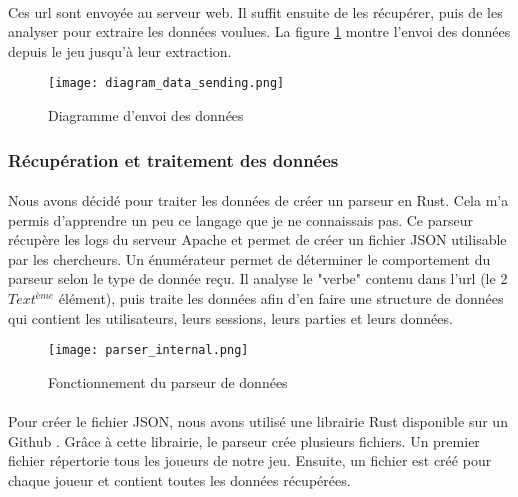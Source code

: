 \paragraph{}Ces url sont envoyée au serveur web. Il suffit ensuite de les récupérer, puis de les analyser pour extraire les données voulues. La figure \ref{DataSending} montre l'envoi
des données depuis le jeu jusqu'à leur extraction.

\begin{figure}[H]
    \begin{center}
    \texttt{[image: diagram\_data\_sending.png]}
    \end{center}
    \caption{Diagramme d'envoi des données}
\label{DataSending}
\end{figure}


\subsubsection{Récupération et traitement des données}

\paragraph{}Nous avons décidé pour traiter les données de créer un parseur en Rust. Cela m'a permis d'apprendre un peu ce langage que je ne connaissais pas. Ce parseur récupère les logs
du serveur Apache et permet de créer un fichier JSON utilisable par les chercheurs. Un énumérateur permet de déterminer le comportement du parseur selon le type de donnée reçu. Il analyse
le "verbe" contenu dans l'url (le 2$Text^{ème}$ élément), puis traite les données afin d'en faire une structure de données qui contient les utilisateurs, leurs sessions, leurs parties et
leurs données.

\begin{figure}[H]
    \begin{center}
    \texttt{[image: parser\_internal.png]}
    \end{center}
    \caption{Fonctionnement du parseur de données}
\label{DataParser}
\end{figure}

\paragraph{}Pour créer le fichier JSON, nous avons utilisé une librairie Rust disponible sur un Github \cite{JSONRUST}. Grâce à cette librairie, le parseur crée plusieurs fichiers.
Un premier fichier répertorie tous les joueurs de notre jeu. Ensuite, un fichier est créé pour chaque joueur et contient toutes les données récupérées.